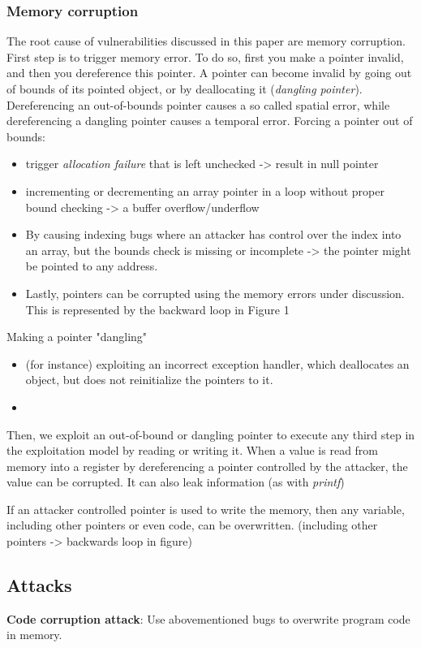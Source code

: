 \documentclass{article}
\begin{document}
\subsubsection{Memory corruption}
The root cause of vulnerabilities discussed in this paper are memory corruption. First step is to trigger memory error. 
To do so, first you make a pointer invalid, and then you dereference this pointer. A pointer can become invalid by going out of bounds of its pointed object, or by deallocating it (\textit{dangling pointer}). 
Dereferencing an out-of-bounds pointer causes a so
called spatial error, while dereferencing a dangling pointer
causes a temporal error.
Forcing a pointer out of bounds: 
\begin{itemize}
\item trigger \textit{allocation failure} that is left unchecked -> result in null pointer 
\item incrementing or decrementing an array pointer in a loop without proper bound checking -> a buffer overflow/underflow
\item By causing indexing bugs where an attacker has control over the index into an array, but the bounds check is missing or incomplete -> the pointer might be pointed to any
address.
\item Lastly, pointers can be corrupted using the memory errors under discussion. This is represented by the backward loop in Figure 1
\end{itemize}
Making a pointer "dangling"
\begin{itemize}
\item (for instance) exploiting an incorrect exception handler, which deallocates an object, but does not reinitialize the pointers to it.
\item 
\end{itemize}

Then, we exploit an out-of-bound or dangling pointer to execute any third step in the exploitation model by reading or writing it. 
When a value is read from memory into a register by dereferencing a pointer controlled by the attacker, the value can be corrupted. It 
can also leak information (as with \textit{printf})

If an attacker controlled pointer is used to write the
memory, then any variable, including other pointers or even
code, can be overwritten. (including other pointers -> backwards loop in figure) 

\subsection{Attacks}
\textbf{Code corruption attack}: Use abovementioned bugs to overwrite program code in memory. 
\end{document}
